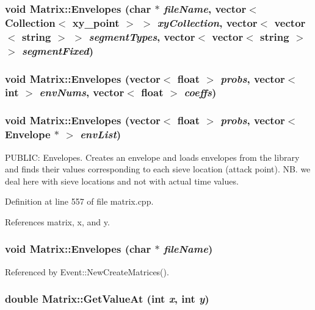 \subsubsection{\setlength{\rightskip}{0pt plus 5cm}void Matrix::Envelopes (char $\ast$ {\em file\-Name}, vector$<$ Collection$<$ xy\_\-point $>$ $>$ {\em xy\-Collection}, vector$<$ vector$<$ string $>$ $>$ {\em segment\-Types}, vector$<$ vector$<$ string $>$ $>$ {\em segment\-Fixed})}\label{classMatrix_a19}


\subsubsection{\setlength{\rightskip}{0pt plus 5cm}void Matrix::Envelopes (vector$<$ float $>$ {\em probs}, vector$<$ int $>$ {\em env\-Nums}, vector$<$ float $>$ {\em coeffs})}\label{classMatrix_a18}


\subsubsection{\setlength{\rightskip}{0pt plus 5cm}void Matrix::Envelopes (vector$<$ float $>$ {\em probs}, vector$<$ Envelope $\ast$ $>$ {\em env\-List})}\label{classMatrix_a17}


PUBLIC: Envelopes. Creates an envelope and loads envelopes from the library and finds their values corresponding to each sieve location (attack point). NB. we deal here with sieve locations and not with actual time values. 

Definition at line 557 of file matrix.cpp.

References matrix, x, and y.
\subsubsection{\setlength{\rightskip}{0pt plus 5cm}void Matrix::Envelopes (char $\ast$ {\em file\-Name})}\label{classMatrix_a16}




Referenced by Event::New\-Create\-Matrices().
\subsubsection{\setlength{\rightskip}{0pt plus 5cm}double Matrix::Get\-Value\-At (int {\em x}, int {\em y})}\label{classMatrix_a25}



